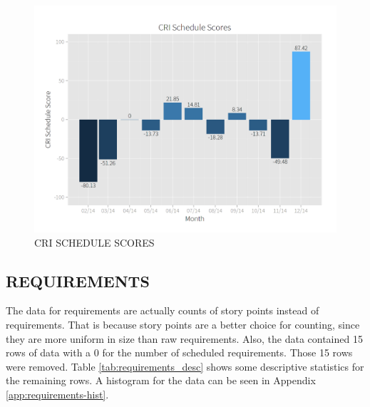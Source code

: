 \documentclass[SDSUThesis.tex]{subfiles}
\begin{document}
        \begin{figure}[htb]
            \centering
            \includegraphics[scale=.28]{images/schedule_scores.png}
            \caption{CRI SCHEDULE SCORES}
            \label{fig:schedule-scores}
        \end{figure}
        
        
    \subsection{REQUIREMENTS}
    \label{sec:case-req}
        The data for requirements are actually counts of story points
        instead of requirements.  That is because story points
        are a better choice for counting, since they are more
        uniform in size than raw requirements.  Also, the data
        contained 15 rows of data with a 0 for the number of
        scheduled requirements.  Those 15 rows were removed.
        Table \ref{tab:requirements_desc} shows some descriptive
        statistics for the remaining rows. A histogram for the
        data can be seen in Appendix \ref{app:requirements-hist}.
        
\end{document}
